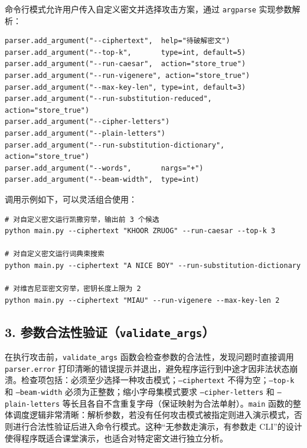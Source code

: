\documentclass[12pt, a4paper]{article}
\begin{document}
命令行模式允许用户传入自定义密文并选择攻击方案，通过 \texttt{argparse} 实现参数解析：

\begin{lstlisting}[style=python, caption={命令行参数定义（main.py）}]
parser.add_argument("--ciphertext",  help="待破解密文")
parser.add_argument("--top-k",       type=int, default=5)
parser.add_argument("--run-caesar",  action="store_true")
parser.add_argument("--run-vigenere", action="store_true")
parser.add_argument("--max-key-len", type=int, default=3)
parser.add_argument("--run-substitution-reduced",    action="store_true")
parser.add_argument("--cipher-letters")
parser.add_argument("--plain-letters")
parser.add_argument("--run-substitution-dictionary", action="store_true")
parser.add_argument("--words",       nargs="+")
parser.add_argument("--beam-width",  type=int)
\end{lstlisting}

调用示例如下，可以灵活组合使用：

\begin{lstlisting}[style=shell, caption={命令行调用示例}]
# 对自定义密文运行凯撒穷举，输出前 3 个候选
python main.py --ciphertext "KHOOR ZRUOG" --run-caesar --top-k 3

# 对自定义密文运行词典束搜索
python main.py --ciphertext "A NICE BOY" --run-substitution-dictionary

# 对维吉尼亚密文穷举，密钥长度上限为 2
python main.py --ciphertext "MIAU" --run-vigenere --max-key-len 2
\end{lstlisting}

\subsection{3. 参数合法性验证（\texttt{validate\_args}）}

在执行攻击前，\texttt{validate\_args} 函数会检查参数的合法性，发现问题时直接调用 \texttt{parser.error} 打印清晰的错误提示并退出，避免程序运行到中途才因非法状态崩溃。检查项包括：必须至少选择一种攻击模式；\texttt{--ciphertext} 不得为空；\texttt{--top-k} 和 \texttt{--beam-width} 必须为正整数；缩小字母集模式要求 \texttt{--cipher-letters} 和 \texttt{--plain-letters} 等长且各自不含重复字母（保证映射为合法单射）。\texttt{main} 函数的整体调度逻辑非常清晰：解析参数，若没有任何攻击模式被指定则进入演示模式，否则进行合法性验证后进入命令行模式。这种``无参数走演示，有参数走 CLI''的设计使得程序既适合课堂演示，也适合对特定密文进行独立分析。

\end{document}
